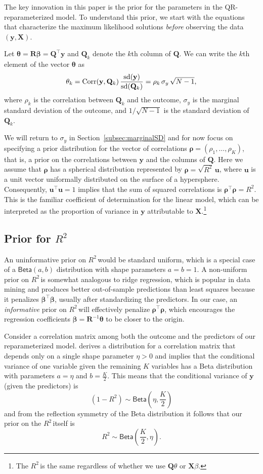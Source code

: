 \documentclass[11pt]{article}
\newcommand{\Rsq}{$R^2\,$}
\newcommand{\boldrho}{\boldsymbol{\rho}}
\newcommand{\boldbeta}{\boldsymbol{\beta}}
\newcommand{\boldtheta}{\boldsymbol{\theta}}
\newcommand{\X}{\mathbf{X}}
\newcommand{\y}{\mathbf{y}}
\newcommand{\Q}{\mathbf{Q}}
\newcommand{\R}{\mathbf{R}}
\renewcommand{\u}{\mathbf{u}}
\newcommand{\halfK}{\frac{K}{2}}
\newcommand{\Betadist}[2]{\mathsf{Beta}\left(#1,#2\right)}
\begin{document}
The key innovation in this paper is the prior for the parameters in the
QR-reparameterized model. To understand this prior, we start with the equations
that characterize the maximum likelihood solutions \emph{before} observing the
data $\left(\y, \X\right)$.

Let $\boldtheta = \R\boldbeta = \Q^\top \y$ and $\Q_k$ denote the $k$th column
of $\Q$. We can write the $k$th element of the vector $\boldtheta$ as
$$\theta_k
  = {\rm Corr}(\y, \Q_k) \, \frac{{\rm sd}(\y)}{{\rm sd}(\Q_k)}
  = \rho_k \, \sigma_y \, \sqrt{N - 1},
$$
where $\rho_k$ is the correlation between $\Q_k$ and the outcome, $\sigma_y$ is
the marginal standard deviation of the outcome, and $1/\sqrt{N-1}$ is the
standard deviation of $\Q_k$.

We will return to $\sigma_y$ in Section~\ref{subsec:marginalSD} and for now
focus on specifying a prior distribution for the vector of correlations
$\boldrho = (\rho_1, \dots, \rho_K)$, that is, a prior on the correlations
between $\y$ and the columns of $\Q$. Here we assume that $\boldrho$ has a
spherical distribution represented by $\boldrho = \sqrt{R^2} \, \u$, where $\u$
is a unit vector uniformally distributed on the surface of a hypersphere.
Consequently, $\u^\top\u = 1$ implies that the sum of squared correlations is
$\boldrho^\top \boldrho = R^2$. This is the familiar coefficient of determination for
the linear model, which can be interpreted as the proportion of variance in $\y$
attributable to $\X$.\footnote{The \Rsq is the same regardless of whether we
use $\Q\theta$ or $\X\beta$.}

\subsection{Prior for \Rsq}
\label{subsec:r2prior}

An uninformative prior on \Rsq would be standard uniform, which is a special
case of a $\Betadist{a}{b}$ distribution with shape parameters $a = b = 1$.
A non-uniform prior on \Rsq is somewhat analogous to ridge
regression, which is popular in data mining and produces better out-of-sample
predictions than least squares because it penalizes $\boldbeta^\top \boldbeta$,
usually after standardizing the predictors. In our case, an \emph{informative}
prior on \Rsq will effectively penalize $\boldrho^\top \boldrho$, which
encourages the regression coefficients $\boldbeta = \R^{-1} \boldtheta$
to be closer to the origin.

Consider a correlation matrix among both the outcome and the predictors of our
reparameterized model.  derives a distribution for a correlation
matrix that depends only on a single shape parameter $\eta > 0$ and implies that
the conditional variance of one variable given the remaining $K$ variables has a
Beta distribution with parameters $a = \eta$ and $b = \halfK$. This means that
the conditional variance of $\y$ (given the predictors) is
%
$$(1 - R^2) \sim \Betadist{\eta}{\halfK}$$
%
and from the reflection symmetry of the Beta distribution it follows that our
prior on the \Rsq itself is
%
$$R^2 \sim \Betadist{\halfK}{\eta}.$$
\end{document}
